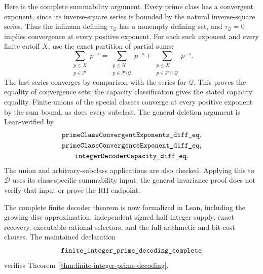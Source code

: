 \documentclass[11pt]{article}
\theoremstyle{definition}
\begin{document}
Here is the complete summability argument.
Every prime class has a convergent exponent, since its
inverse-square series is bounded by the natural inverse-square
series. Thus the infimum defining $\tau_{\mathcal Q}$ has
a nonempty defining set, and $\tau_{\mathcal Q}=0$ implies
convergence at every positive exponent.
For each such exponent and every finite cutoff $X$, use the
exact partition of partial sums:
\[
 \sum_{\substack{p\le X\\p\in\mathcal P}}p^{-s}
 =
 \sum_{\substack{p\le X\\p\in\mathcal P\setminus\mathcal Q}}p^{-s}
 +\sum_{\substack{p\le X\\p\in\mathcal P\cap\mathcal Q}}p^{-s}.
\]
The last series converges by comparison with the series for
$\mathcal Q$. This proves the equality of convergence sets;
the capacity classification gives the stated capacity equality.
Finite unions of the special classes converge at every
positive exponent by the sum bound, as does every subclass.
The general deletion argument is Lean-verified by
\[
 \begin{gathered}
 \texttt{primeClassConvergentExponents\_\allowbreak diff\_\allowbreak eq},\\
 \texttt{primeClassConvergenceExponent\_\allowbreak diff\_\allowbreak eq},\\
 \texttt{integerDecoderCapacity\_\allowbreak diff\_\allowbreak eq}.
 \end{gathered}
\]
The union and arbitrary-subclass applications are also checked.
Applying this to $\mathcal D$ uses its class-specific summability
input; the general invariance proof does not verify that input
or prove the RH endpoint.

The complete finite decoder theorem is now formalized in Lean,
including the growing-disc approximation, independent signed
half-integer supply, exact recovery, executable rational selectors,
and the full arithmetic and bit-cost clauses.
The maintained declaration
\[
 \texttt{finite\_\allowbreak integer\_\allowbreak prime\_\allowbreak
 decoding\_\allowbreak complete}
\]
verifies Theorem~\ref{thm:finite-integer-prime-decoding}.
\end{document}
